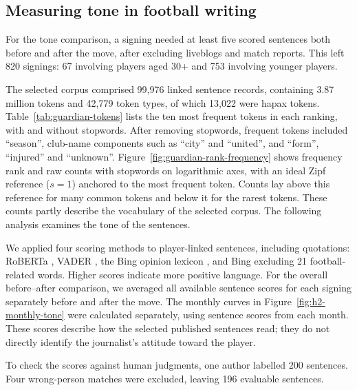 \subsection*{Measuring tone in football writing}

For the tone comparison, a signing needed at least five scored sentences both before and after the move, after excluding liveblogs and match reports. This left 820 signings: 67 involving players aged 30+ and 753 involving younger players.

The selected corpus comprised 99,976 linked sentence records, containing 3.87 million tokens and 42,779 token types, of which 13,022 were hapax tokens. Table~\ref{tab:guardian-tokens} lists the ten most frequent tokens in each ranking, with and without stopwords. After removing stopwords, frequent tokens included ``season'', club-name components such as ``city'' and ``united'', and ``form'', ``injured'' and ``unknown''. Figure~\ref{fig:guardian-rank-frequency} shows frequency rank and raw counts with stopwords on logarithmic axes, with an ideal Zipf reference ($s = 1$) anchored to the most frequent token. Counts lay above this reference for many common tokens and below it for the rarest tokens. These counts partly describe the vocabulary of the selected corpus. The following analysis examines the tone of the sentences.

We applied four scoring methods to player-linked sentences, including quotations: RoBERTa \cite{liu2019roberta,loureiro2022timelms,camachocollados2022tweetnlp,cardiffnlp2022checkpoint}, VADER \cite{hutto2014vader}, the Bing opinion lexicon \cite{hu2004mining}, and Bing excluding 21 football-related words. Higher scores indicate more positive language. For the overall before--after comparison, we averaged all available sentence scores for each signing separately before and after the move. The monthly curves in Figure~\ref{fig:h2-monthly-tone} were calculated separately, using sentence scores from each month. These scores describe how the selected published sentences read; they do not directly identify the journalist's attitude toward the player.

To check the scores against human judgments, one author labelled 200 sentences. Four wrong-person matches were excluded, leaving 196 evaluable sentences.

